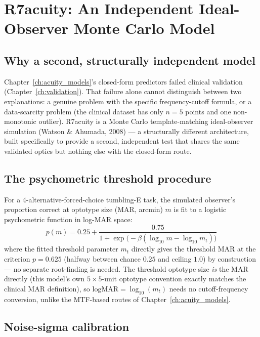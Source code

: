 \chapter{R7acuity: An Independent Ideal-Observer Monte Carlo Model}
\label{ch:r7acuity}

\section{Why a second, structurally independent model}

Chapter~\ref{ch:acuity_models}'s closed-form predictors failed clinical validation
(Chapter~\ref{ch:validation}). That failure alone cannot distinguish between two
explanations: a genuine problem with the specific frequency-cutoff formula, or a
data-scarcity problem (the clinical dataset has only $n=5$ points and one
non-monotonic outlier). R7acuity is a Monte Carlo template-matching ideal-observer
simulation (Watson \& Ahumada, 2008) --- a structurally different architecture, built
specifically to provide a second, independent test that shares the same validated
optics but nothing else with the closed-form route.

\section{The psychometric threshold procedure}

For a 4-alternative-forced-choice tumbling-E task, the simulated observer's proportion
correct at optotype size (MAR, arcmin) $m$ is fit to a logistic psychometric function
in log-MAR space:
\begin{equation}
p(m) = 0.25 + \frac{0.75}{1+\exp\big(-\beta(\log_{10}m - \log_{10}m_t)\big)}
\end{equation}
where the fitted threshold parameter $m_t$ directly gives the threshold MAR at the
criterion $p=0.625$ (halfway between chance $0.25$ and ceiling $1.0$) by construction
--- no separate root-finding is needed. The threshold optotype size \emph{is} the MAR
directly (this model's own $5\times5$-unit optotype convention exactly matches the
clinical MAR definition), so $\text{logMAR}=\log_{10}(m_t)$ needs no cutoff-frequency
conversion, unlike the MTF-based routes of Chapter~\ref{ch:acuity_models}.

\section{Noise-sigma calibration}

